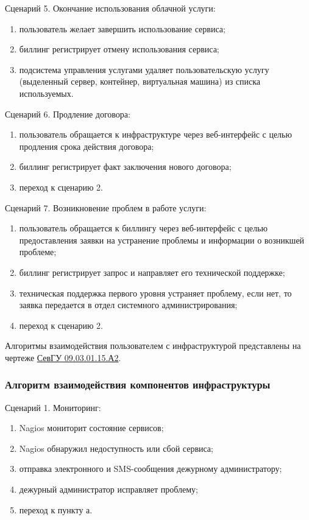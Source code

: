 Сценарий 5. Окончание использования облачной услуги:
\begin{enumerate}
  \item пользователь желает завершить использование сервиса;
  \item биллинг регистрирует отмену использования сервиса;
  \item подсистема управления услугами удаляет пользовательскую услугу (выделенный сервер, контейнер, виртуальная машина) из списка используемых.
\end{enumerate}

Сценарий 6. Продление договора:
\begin{enumerate}
  \item пользователь обращается к инфраструктуре через веб-интерфейс с целью продления срока действия договора;
  \item биллинг регистрирует факт заключения нового договора;
  \item переход к сценарию 2.
\end{enumerate}

Сценарий 7. Возникновение проблем в работе услуги:
\begin{enumerate}
  \item пользователь обращается к биллингу через веб-интерфейс с целью предоставления заявки на устранение проблемы и информации о возникшей проблеме;
  \item биллинг регистрирует запрос и направляет его технической поддержке;
  \item техническая поддержка первого уровня устраняет проблему, если нет, то заявка передается в отдел системного администрирования;
  \item переход к сценарию 2.
\end{enumerate}

Алгоритмы взаимодействия пользователем с инфраструктурой представлены на чертеже \href{extra/drafts/SevGU_09.03.01.15.A2.pdf}{СевГУ 09.03.01.15.А2}.

\subsubsection{Алгоритм взаимодействия компонентов инфраструктуры}

Сценарий 1. Мониторинг:
\begin{enumerate}
  \item Nagios мониторит состояние сервисов;
  \item Nagios обнаружил недоступность или сбой сервиса;
  \item отправка электронного и SMS-сообщения дежурному администратору;
  \item дежурный администратор исправляет проблему;
  \item переход к пункту а.
\end{enumerate}

